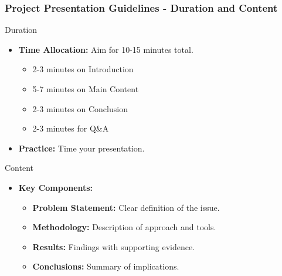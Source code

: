 \documentclass[aspectratio=169]{beamer}
\begin{document}
\begin{frame}[fragile]
    \frametitle{Project Presentation Guidelines - Duration and Content}
    \begin{block}{Duration}
        \begin{itemize}
            \item \textbf{Time Allocation:} Aim for 10-15 minutes total.
            \begin{itemize}
                \item 2-3 minutes on Introduction
                \item 5-7 minutes on Main Content
                \item 2-3 minutes on Conclusion
                \item 2-3 minutes for Q\&A
            \end{itemize}
            \item \textbf{Practice:} Time your presentation.
        \end{itemize}
    \end{block}

    \begin{block}{Content}
        \begin{itemize}
            \item \textbf{Key Components:}
            \begin{itemize}
                \item \textbf{Problem Statement:} Clear definition of the issue.
                \item \textbf{Methodology:} Description of approach and tools.
                \item \textbf{Results:} Findings with supporting evidence.
                \item \textbf{Conclusions:} Summary of implications.
            \end{itemize}
        \end{itemize}
    \end{block}
\end{frame}
\end{document}
